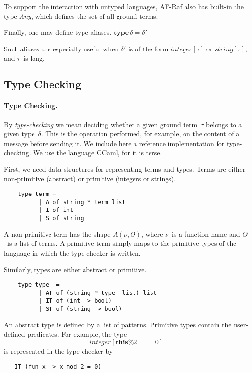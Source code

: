 \documentclass[a4paper,12pt,oneside,fleqn]{book} %
\theoremstyle{plain}
\theoremstyle{definition}
\theoremstyle{remark}
\begin{document}
To support the interaction with untyped languages, AF-Raf also has built-in
the type \textit{Any}, which defines the set of all ground terms.

Finally, one may define type aliases.
$\mathbf{type}\,\delta=\delta'$

Such aliases are especially useful when $\delta'$ is of the form
$\mathit{integer}[\tau]$ or $\mathit{string}[\tau]$, and $\tau$~is long.
\subsection{Type Checking} %
\paragraph{Type Checking.}
By \emph{type-checking} we mean deciding whether a given ground term~$\tau$
belongs to a given type~$\delta$. This is the operation performed, for
example, on the content of a message before sending it. We include here a
reference implementation for type-checking. We use the language OCaml, for
it is terse.

First, we need data structures for representing terms and types. Terms are
either non-primitive (abstract) or primitive (integers or strings).
\begin{verbatim}
    type term =
          | A of string * term list
          | I of int
          | S of string
\end{verbatim}
A non-primitive term has the shape $A(\nu,\Theta)$, where $\nu$~is a
function name and $\Theta$~is a list of terms. A primitive term simply maps
to the primitive types of the language in which the type-checker is
written.

Similarly, types are either abstract or primitive.
\begin{verbatim}
    type type_ =
          | AT of (string * type_ list) list
          | IT of (int -> bool)
          | ST of (string -> bool)
\end{verbatim}
An abstract type is defined by a list of patterns. Primitive types contain the
user-defined predicates. For example, the type
\[\mathit{integer}[\mathbf{this}\%2==0]\] is represented in the type-checker by
\begin{verbatim}
   IT (fun x -> x mod 2 = 0)
\end{verbatim}
\end{document}
